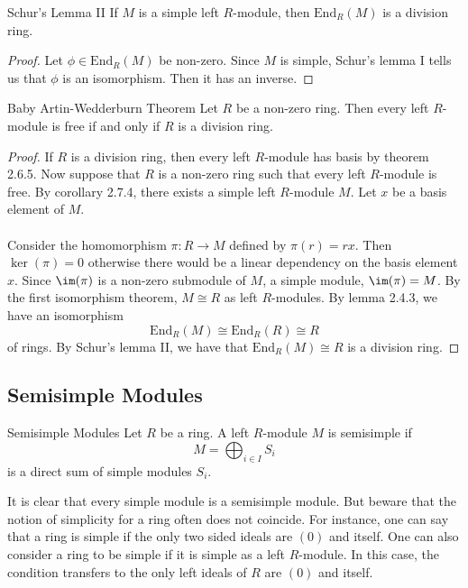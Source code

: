 \documentclass[a4paper]{article}
\begin{document}
\begin{crl}{Schur's Lemma II}{} If $M$ is a simple left $R$-module, then $\text{End}_R(M)$ is a division ring. \tcbline
\begin{proof}
Let $\phi\in\text{End}_R(M)$ be non-zero. Since $M$ is simple, Schur's lemma I tells us that $\phi$ is an isomorphism. Then it has an inverse. 
\end{proof}
\end{crl}

\begin{thm}{Baby Artin-Wedderburn Theorem}{} Let $R$ be a non-zero ring. Then every left $R$-module is free if and only if $R$ is a division ring. \tcbline
\begin{proof}
If $R$ is a division ring, then every left $R$-module has basis by theorem 2.6.5. Now suppose that $R$ is a non-zero ring such that every left $R$-module is free. By corollary 2.7.4, there exists a simple left $R$-module $M$. Let $x$ be a basis element of $M$. \\~\\

Consider the homomorphism $\pi:R\to M$ defined by $\pi(r)=rx$. Then $\ker(\pi)=0$ otherwise there would be a linear dependency on the basis element $x$. Since $\im(\pi)$ is a non-zero submodule of $M$, a simple module, $\im(\pi)=M$. By the first isomorphism theorem, $M\cong R$ as left $R$-modules. By lemma 2.4.3, we have an isomorphism $$\text{End}_R(M)\cong\text{End}_R(R)\cong R$$ of rings. By Schur's lemma II, we have that $\text{End}_R(M)\cong R$ is a division ring. 
\end{proof}
\end{thm}

\subsection{Semisimple Modules}
\begin{defn}{Semisimple Modules}{} Let $R$ be a ring. A left $R$-module $M$ is semisimple if $$M=\bigoplus_{i\in I}S_i$$ is a direct sum of simple modules $S_i$. 
\end{defn}

It is clear that every simple module is a semisimple module. But beware that the notion of simplicity for a ring often does not coincide. For instance, one can say that a ring is simple if the only two sided ideals are $(0)$ and itself. One can also consider a ring to be simple if it is simple as a left $R$-module. In this case, the condition transfers to the only left ideals of $R$ are $(0)$ and itself. \\~\\
\end{document}
